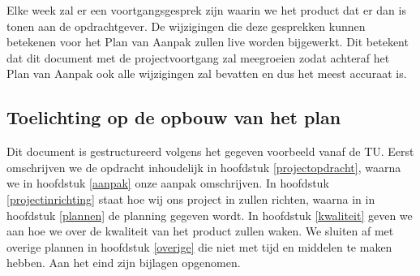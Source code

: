 Elke week zal er een voortgangsgesprek zijn waarin we het product dat er dan is tonen aan de opdrachtgever.
De wijzigingen die deze gesprekken kunnen betekenen voor het Plan van Aanpak zullen live worden bijgewerkt.
Dit betekent dat dit document met de projectvoortgang zal meegroeien zodat achteraf het Plan van Aanpak ook alle wijzigingen zal bevatten en dus het meest accuraat is.


\subsection{Toelichting op de opbouw van het plan}

Dit document is gestructureerd volgens het gegeven voorbeeld vanaf de TU.
Eerst omschrijven we de opdracht inhoudelijk in hoofdstuk \ref{projectopdracht}, waarna we in hoofdstuk \ref{aanpak} onze aanpak omschrijven.
In hoofdstuk \ref{projectinrichting} staat hoe wij ons project in zullen richten, waarna in in hoofdstuk \ref{plannen} de planning gegeven wordt.
In hoofdstuk \ref{kwaliteit} geven we aan hoe we over de kwaliteit van het product zullen waken.
We sluiten af met overige plannen in hoofdstuk \ref{overige} die niet met tijd en middelen te maken hebben. Aan het eind zijn bijlagen opgenomen. 
